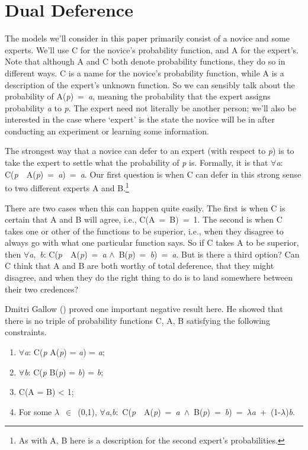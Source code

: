 \documentclass[
  12pt,
  letterpaper,
  DIV=11,
  numbers=noendperiod]{scrartcl}
\providecommand{\tightlist}{%
  \setlength{\itemsep}{0pt}\setlength{\parskip}{0pt}}\usepackage{longtable,booktabs,array}
\begin{document}
\section{Dual Deference}\label{sec-gallow}

The models we'll consider in this paper primarily consist of a novice
and some experts. We'll use C for the novice's probability function, and
A for the expert's. Note that although A and C both denote probability
functions, they do so in different ways. C is a name for the novice's
probability function, while A is a description of the expert's unknown
function. So we can sensibly talk about the probability of
A(\emph{p})~=~\emph{a}, meaning the probability that the expert assigns
probability \emph{a} to \emph{p}. The expert need not literally be
another person; we'll also be interested in the case where `expert' is
the state the novice will be in after conducting an experiment or
learning some information.

The strongest way that a novice can defer to an expert (with respect to
\emph{p}) is to take the expert to settle what the probability of
\emph{p} is. Formally, it is that $\forall$\emph{a}:
C(\emph{p}~\textbar~A(\emph{p})~=~\emph{a})~=~\emph{a}. Our first
question is when C can defer in this strong sense to two different
experts A and B.\footnote{As with A, B here is a description for the
  second expert's probabilities.}

There are two cases when this can happen quite easily. The first is when
C is certain that A and B will agree, i.e., C(A~=~B)~=~1. The second is
when C takes one or other of the functions to be superior, i.e., when
they disagree to always go with what one particular function says. So if
C takes A to be superior, then $\forall$\emph{a},~\emph{b}:
C(\emph{p}~\textbar~A(\emph{p})~=~\emph{a}
$\wedge$~B(\emph{p})~=~\emph{b})~=~\emph{a}. But is there a third option? Can C
think that A and B are both worthy of total deference, that they might
disagree, and when they do the right thing to do is to land somewhere
between their two credences?

Dmitri Gallow () proved one important
negative result here. He showed that there is no triple of probability
functions C, A, B satisfying the following constraints.

\begin{enumerate}
\def\labelenumi{\arabic{enumi}.}
\tightlist
\item
  $\forall$\emph{a}: C(\emph{p} \textbar{} A(\emph{p}) = \emph{a}) = \emph{a};
\item
  $\forall$\emph{b}: C(\emph{p} \textbar{} B(\emph{p}) = \emph{b}) = \emph{b};
\item
  C(A = B) \textless{} 1;
\item
  For some $\lambda$~$\in$~(0,1),
  $\forall$\emph{a},\emph{b}:~C(\emph{p}~\textbar~A(\emph{p})~=~\emph{a}~$\wedge$~B(\emph{p})~=~\emph{b})~=~$\lambda$\emph{a}~+~(1-$\lambda$)\emph{b}.
\end{enumerate}
\end{document}
